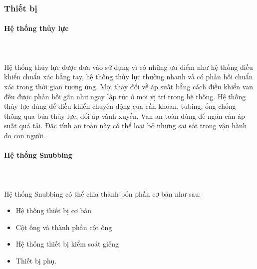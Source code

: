 \documentclass[12pt,a4paper]{article}
\newcommand{\subsubsubsection}[1]{\paragraph{#1}\mbox{}\\}
\begin{document}
\subsubsection{Thiết bị}
	\subsubsubsection{Hệ thống thủy lực}\\
	Hệ thống thủy lực được đưa vào sử dụng vì có những ưu điểm như hệ thống điều khiển chuẩn xác bằng tay, hệ thống thủy lực thường nhanh và có phản hồi chuẩn xác trong thời gian tương ứng. Mọi thay đổi về áp suất bằng cách điều khiển van đều được phản hồi gần như ngay lập tức ở mọi vị trí trong hệ thống. Hệ thống thủy lực dùng để điều khiển chuyển động của cần khoan, tubing, ống chống thông qua búa thủy lực, đối áp vành xuyến. Van an toàn dùng để ngăn cản áp suất quá tải. Đặc tính an toàn này có thể loại bỏ những sai sót trong vận hành do con người.
	\subsubsubsection{Hệ thống Snubbing}\\
	Hệ thống Snubbing có thể chia thành bốn phần cơ bản như sau:
	\begin{itemize}
		\item Hệ thống thiết bị cơ bản
		\item Cột ống và thành phần cột ống
		\item Hệ thống thiết bị kiểm soát giếng
		\item Thiết bị phụ.
	\end{itemize}
\end{document}
